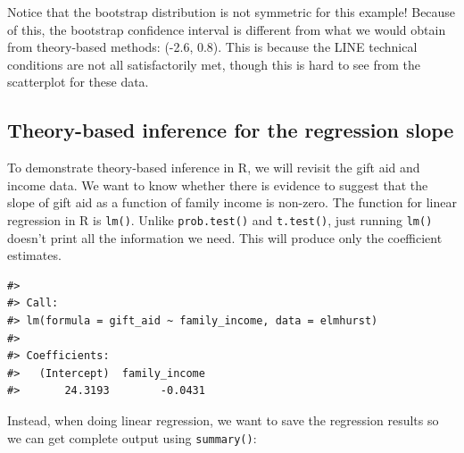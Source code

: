 \documentclass[
  10pt,
  openany]{book}
\theoremstyle{definition}
\theoremstyle{definition}
\theoremstyle{definition}
\theoremstyle{definition}
\theoremstyle{remark}
\begin{document}
Notice that the bootstrap distribution is not symmetric for this example! Because of this, the bootstrap confidence interval is different from what we would obtain from theory-based methods: (-2.6, 0.8). This is because the LINE technical conditions are not all satisfactorily met, though this is hard to see from the scatterplot for these data.

\subsection*{Theory-based inference for the regression slope}\label{theory-based-inference-for-the-regression-slope}

To demonstrate theory-based inference in R, we will revisit the gift aid and income data. We want to know whether there is evidence to suggest that the slope of gift aid as a function of family income is non-zero. The function for linear regression in R is \texttt{lm()}. Unlike \texttt{prob.test()} and \texttt{t.test()}, just running \texttt{lm()} doesn't print all the information we need. This will produce only the coefficient estimates.

\begin{verbatim}
#> 
#> Call:
#> lm(formula = gift_aid ~ family_income, data = elmhurst)
#> 
#> Coefficients:
#>   (Intercept)  family_income  
#>       24.3193        -0.0431
\end{verbatim}

Instead, when doing linear regression, we want to save the regression results so we can get complete output using \texttt{summary()}:
\end{document}
